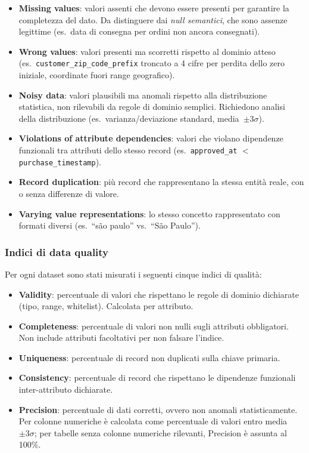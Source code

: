 \documentclass[12pt,a4paper]{article}
\begin{document}
\begin{itemize}
\sloppy
  \item \textbf{Missing values}: valori assenti che devono essere presenti per garantire
        la completezza del dato. Da distinguere dai \textit{null semantici}, che sono
        assenze legittime (es.\ data di consegna per ordini non ancora consegnati).
  \item \textbf{Wrong values}: valori presenti ma scorretti rispetto al dominio atteso
        (es.\ \texttt{customer\_zip\_code\_prefix} troncato a 4 cifre per perdita
        dello zero iniziale, coordinate fuori range geografico).
  \item \textbf{Noisy data}: valori plausibili ma anomali rispetto alla distribuzione
        statistica, non rilevabili da regole di dominio semplici. Richiedono analisi
        della distribuzione (es.\ varianza/deviazione standard, media~$\pm 3\sigma$).
  \item \textbf{Violations of attribute dependencies}: valori che violano dipendenze
        funzionali tra attributi dello stesso record (es.\ \texttt{approved\_at} $<$
        \texttt{purchase\_timestamp}).
  \item \textbf{Record duplication}: più record che rappresentano la stessa entità
        reale, con o senza differenze di valore.
  \item \textbf{Varying value representations}: lo stesso concetto rappresentato con
        formati diversi (es.\ ``são paulo'' vs.\ ``São Paulo'').
\end{itemize}

\subsubsection*{Indici di data quality}

Per ogni dataset sono stati misurati i seguenti cinque indici di qualità:

\begin{itemize}
  \item \textbf{Validity}: percentuale di valori che rispettano le regole di dominio
        dichiarate (tipo, range, whitelist). Calcolata per attributo.
  \item \textbf{Completeness}: percentuale di valori non nulli sugli attributi
        obbligatori. Non include attributi facoltativi per non falsare l'indice.
  \item \textbf{Uniqueness}: percentuale di record non duplicati sulla chiave primaria.
  \item \textbf{Consistency}: percentuale di record che rispettano le dipendenze
        funzionali inter-attributo dichiarate.
  \item \textbf{Precision}: percentuale di dati corretti, ovvero non anomali
        statisticamente. Per colonne numeriche è calcolata come percentuale di
        valori entro media~$\pm 3\sigma$; per tabelle senza colonne numeriche
        rilevanti, Precision è assunta al 100\%.
\end{itemize}
\end{document}
